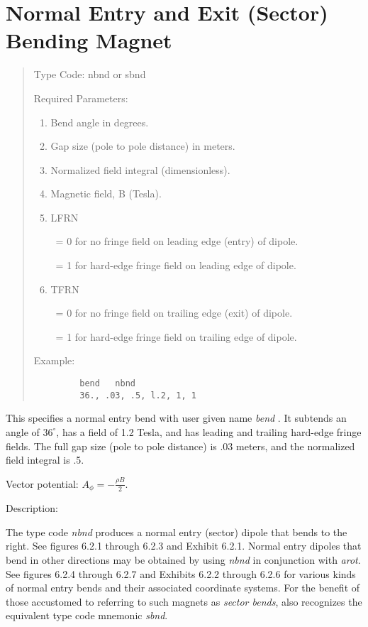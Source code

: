 \section{Normal Entry and Exit (Sector) Bending Magnet}
\begin{quotation}
\noindent Type Code:  nbnd or sbnd
\vspace{5mm}

\noindent Required Parameters:
\begin{enumerate}
      \item  Bend angle in degrees.
      \item  Gap size (pole to pole distance) in meters.
      \item  Normalized field integral (dimensionless).
      \item  Magnetic field, B (Tesla).
      \item  LFRN

             \ = 0 for no fringe field on leading edge (entry) of dipole.

             \ = 1 for hard-edge fringe field on leading edge of dipole.
      \item  TFRN

             \ = 0 for no fringe field on trailing edge (exit) of dipole.

             \ = 1 for hard-edge fringe field on trailing edge of dipole.
\end{enumerate}

\vspace{5mm}
\noindent     Example:
\begin{verbatim}
         bend   nbnd
         36., .03, .5, l.2, 1, 1
\end{verbatim}
\end{quotation}
This specifies a normal entry bend with user given name {\em bend }.   It subtends
an angle of $36^{\circ}$, has a field of 1.2 Tesla, and has leading and trailing
hard-edge fringe fields.  The full gap size (pole to pole distance) is .03 meters,
and the normalized field integral is .5.

\vspace{5mm}
     Vector potential:  ${\displaystyle A_{\phi}  = -\frac{\rho B}{2}}$.

\vspace{5mm}
     Description:
\vspace{2mm}

     The type code {\em nbnd } produces a normal entry (sector) dipole that bends to the right.
See figures 6.2.1 through 6.2.3 and Exhibit 6.2.1.  Normal entry dipoles that bend
in other directions may be obtained by using {\em nbnd} in conjunction with
{\em arot}.  See figures 6.2.4 through 6.2.7 and Exhibits 6.2.2 through 6.2.6
for various kinds of normal entry bends and their associated coordinate
systems.  For the benefit of those accustomed to referring to such
magnets as {\em sector bends}, \Mary also recognizes the equivalent type code
mnemonic {\em sbnd}.

